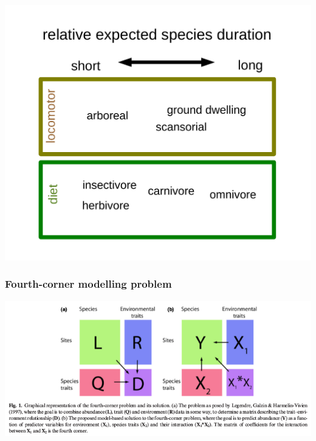 \documentclass{beamer}
\begin{document}
\begin{frame}
  \begin{center}
    \includegraphics[height=0.8\textheight,width=\textwidth,keepaspectratio=true]{figure/smits_2015_results}
  \end{center}

\end{frame}

\begin{frame}
  \frametitle{Fourth-corner modelling problem}
  \begin{center}
    \includegraphics[height=0.8\textheight,width=\textwidth,keepaspectratio=true]{figure/brown_fourth_corner}
  \end{center}

\end{frame}
\end{document}
